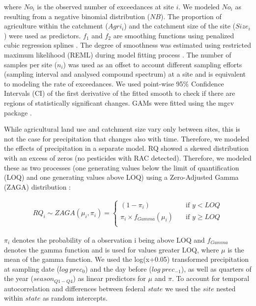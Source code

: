 \documentclass[journal=esthag,manuscript=article]{achemso}
\begin{document}
where $No_i$ is the observed number of exceedances at site $i$. 
We modeled $No_i$ as resulting from a negative binomial distribution ($NB$).
The proportion of agriculture within the catchment ($Agri_i$) and the catchment size of the site ($Size_i$) were used as predictors. 
$f_1$ and $f_2$ are smoothing functions using penalized cubic regression splines \citep{wood_generalized_2006}.
The degree of smoothness was estimated using restricted maximum likelihood (REML) during model fitting process \citep{wood_fast_2011}.
The number of samples per site ($n_i$) was used as an offset to account different sampling efforts (sampling interval and analysed compound spectrum) at a site and is equivalent to modeling the rate of exceedances. 
We used point-wise 95\% Confidence Intervals (CI) of the first derivative of the fitted smooth to check if there are regions of statistically significant changes.
GAMs were fitted using the mgcv package \citep{wood_fast_2011}.

While agricultural land use and catchment size vary only between sites, this is not the case for precipitation that changes also with time.
Therefore, we modeled the effects of precipitation in a separate model.
RQ showed a skewed distribution with an excess of zeros (no pesticides with RAC detected). 
Therefore, we modeled these as two processes (one generating values below the limit of quantification (LOQ) and one generating values above LOQ) using a Zero-Adjusted Gamma (ZAGA) distribution \cite{rigby_generalized_2005,stasinopoulos_gamlss.dist:_2016}:

\begin{align}
RQ_i \sim ZAGA(\mu_i, \pi_i) = 
  \begin{cases}
    (1 - \pi_i)   & \quad  \text{if } y < LOQ \\
    \pi_i \times f_{Gamma} (\mu_i) & \quad \text{if } y \ge LOQ \\
  \end{cases}
  \label{eqn:eqn3}
\end{align}

$\pi_i$ denotes the probability of a observation i being above LOQ and $f_{Gamma}$ denotes the gamma function and is used for values greater LOQ, where $\mu$ is the mean of the gamma function.
We used the log(x+0.05) transformed precipitation at sampling date ($log~prec_0$) and the day before ($log~prec_{-1}$), as well as quarters of the year ($season_{Q1-Q4}$) as linear predictors for $\mu$ and $\pi$.
To account for temporal autocorrelation and differences between federal $state$ we used the $site$ nested within $state$ as random intercepts.
\end{document}
